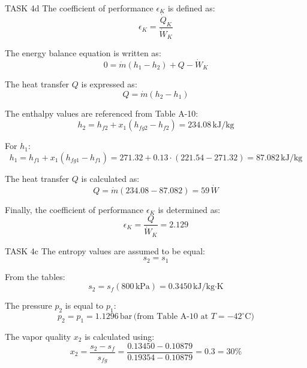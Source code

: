 TASK 4d  
The coefficient of performance \( \epsilon_K \) is defined as:  
\[
\epsilon_K = \frac{\dot{Q}_K}{\dot{W}_K}
\]

The energy balance equation is written as:  
\[
0 = \dot{m} (h_1 - h_2) + Q - \dot{W}_K
\]

The heat transfer \( Q \) is expressed as:  
\[
Q = \dot{m} (h_2 - h_1)
\]

The enthalpy values are referenced from Table A-10:  
\[
h_2 = h_{f2} + x_1 (h_{fg2} - h_{f2}) = 234.08 \, \text{kJ/kg}
\]

For \( h_1 \):  
\[
h_1 = h_{f1} + x_1 (h_{fg1} - h_{f1}) = 271.32 + 0.13 \cdot (221.54 - 271.32) = 87.082 \, \text{kJ/kg}
\]

The heat transfer \( Q \) is calculated as:  
\[
Q = \dot{m} (234.08 - 87.082) = 59 \, \dot{W}
\]

Finally, the coefficient of performance \( \epsilon_K \) is determined as:  
\[
\epsilon_K = \frac{Q}{\dot{W}_K} = 2.129
\]  

TASK 4c  
The entropy values are assumed to be equal:  
\[
s_2 = s_1
\]

From the tables:  
\[
s_2 = s_f(800 \, \text{kPa}) = 0.3450 \, \text{kJ/kg·K}
\]

The pressure \( p_2 \) is equal to \( p_1 \):  
\[
p_2 = p_1 = 1.1296 \, \text{bar} \, \text{(from Table A-10 at } T = -42^\circ\text{C})
\]

The vapor quality \( x_2 \) is calculated using:  
\[
x_2 = \frac{s_2 - s_f}{s_{fg}} = \frac{0.13450 - 0.10879}{0.19354 - 0.10879} = 0.3 = 30\%
\]